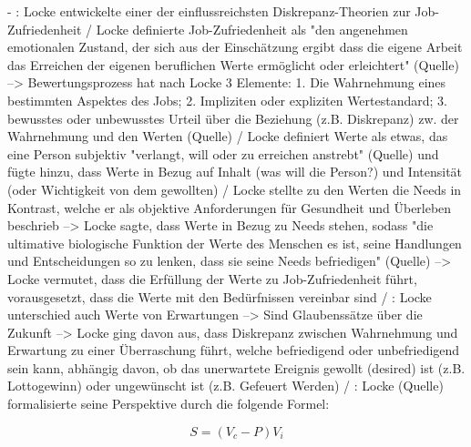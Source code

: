- \cite[S. 12]{edwards:2008}: Locke entwickelte einer der einflussreichsten Diskrepanz-Theorien zur Job-Zufriedenheit / Locke definierte Job-Zufriedenheit als "den angenehmen emotionalen Zustand, der sich aus der Einschätzung ergibt dass die eigene Arbeit das Erreichen der eigenen beruflichen Werte ermöglicht oder erleichtert" (Quelle) --> Bewertungsprozess hat nach Locke 3 Elemente: 1. Die Wahrnehmung eines bestimmten Aspektes des Jobs; 2. Impliziten oder expliziten Wertestandard; 3. bewusstes oder unbewusstes Urteil über die Beziehung (z.B. Diskrepanz) zw. der Wahrnehmung und den Werten (Quelle) / Locke definiert Werte als etwas, das eine Person subjektiv "verlangt, will oder zu erreichen anstrebt" (Quelle) und fügte hinzu, dass Werte in Bezug auf Inhalt (was will die Person?) und Intensität (oder Wichtigkeit von dem gewollten) / Locke stellte zu den Werten die Needs in Kontrast, welche er als objektive Anforderungen für Gesundheit und Überleben beschrieb --> Locke sagte, dass Werte in Bezug zu Needs stehen, sodass "die ultimative biologische Funktion der Werte des Menschen es ist, seine Handlungen und Entscheidungen so zu lenken, dass sie seine Needs befriedigen" (Quelle) --> Locke vermutet, dass die Erfüllung der Werte zu Job-Zufriedenheit führt, vorausgesetzt, dass die Werte mit den Bedürfnissen vereinbar sind / \cite[S. 12f.]{edwards:2008}: Locke unterschied auch Werte von Erwartungen --> Sind Glaubenssätze über die Zukunft --> Locke ging davon aus, dass Diskrepanz zwischen Wahrnehmung und Erwartung zu einer Überraschung führt, welche befriedigend oder unbefriedigend sein kann, abhängig davon, ob das unerwartete Ereignis gewollt (desired) ist (z.B. Lottogewinn) oder ungewünscht ist (z.B. Gefeuert Werden) / \cite[S. 13]{edwards:2008}: Locke (Quelle) formalisierte seine Perspektive durch die folgende Formel:

\begin{equation}
	S = (V_c - P)V_i
	\label{fig:formel1}
\end{equation}

